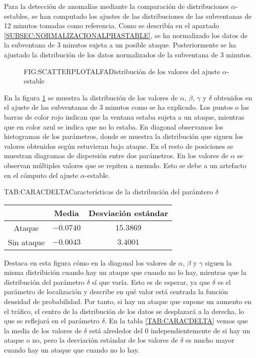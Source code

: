 Para la detección de anomalías mediante la comparación de distribuciones $\alpha$-estables, se han computado los ajustes de las distribuciones de las subventanas de 12 minutos tomadas como referencia. Como se describía en el apartado \ref{SUBSEC:NORMALIZACIONALPHASTABLE}, se ha normalizado los datos de la subventana de 3 minutos sujeta a un posible ataque.
Posteriormente se ha ajustado la distribución de los datos normalizados de la subventana de 3 minutos.

\begin{figure}[Distribución de los valores del ajuste $\alpha$-estable]{FIG:SCATTERPLOTALFA}{Distribución de los valores del ajuste $\alpha$-estable}
    \label{FIG:SCATTERPLOTALFA}
\end{figure}

En la figura \ref{FIG:SCATTERPLOTALFA} se muestra la distribución de los valores de $\alpha$, $\beta$, $\gamma$ y $\delta$ obtenidos en el ajuste de las subventanas de 3 minutos como se ha explicado. Los puntos o las barras de color rojo indican que la ventana estaba sujeta a un ataque, mientras que en color azul se indica que no lo estaba.
En diagonal observamos los histogramas de los parámetros, donde se muestra la distribución que siguen los valores obtenidos según estuvieran bajo ataque. En el resto de posiciones se muestran diagramas de dispersión entre dos parámetros. En los valores de $\alpha$ se observan múltiples valores que se repiten a menudo. Esto se debe a un artefacto en el cómputo del ajuste $\alpha$-estable.

\begin{table}[Características de la distribución del parámtero $\delta$]{TAB:CARACDELTA}{Características de la distribución del parámtero $\delta$}
    \begin{tabular}{|c|c|c|}
        \hline
        & Media & Desviación estándar \\
        \hline
        Ataque & $-0.0740$ & $15.3869$ \\
        Sin ataque & $-0.0043$ & $3.4001$ \\
        \hline
    \end{tabular}
\end{table}

Destaca en esta figura cómo en la diagonal los valores de $\alpha$, $\beta$ y $\gamma$ siguen la misma distribición cuando hay un ataque que cuando no lo hay, mientras que la distribución del parámetro $\delta$ sí que varía. Esto es de esperar, ya que $\delta$ es el parámetro de localización y describe en qué valor está centrada la función
densidad de probabilidad. Por tanto, si hay un ataque que supone un aumento en el tráfico, el centro de la distribución de los datos se desplazará a la derecha, lo que se reflejará en el parámetro $\delta$. En la tabla \ref{TAB:CARACDELTA} vemos que la media de los valores de $\delta$ está alrededor del $0$ independientemente de si hay un ataque o no, pero la desviación estándar de los valores de $\delta$ es mucho mayor cuando hay un ataque que cuando no lo hay. 

